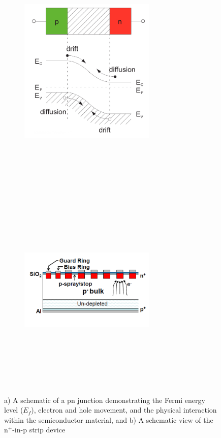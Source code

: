\begin{figure}[h]
    \begin{subfigure}[b]{0.45\textwidth}
        \centering
        \includegraphics[width=6.5cm,height=10cm,keepaspectratio]{Figures/modules/Pnjunction.png}
        \caption{}\label{fig:siliconpnjunction}
    \end{subfigure}
    ~
    \begin{subfigure}[b]{0.45\textwidth}
        \centering
        \includegraphics[width=6.5cm,height=10cm,keepaspectratio]{Figures/modules/striplayout.PNG}
        \caption{}\label{fig:striplayout}
    \end{subfigure}
    \caption{a) A schematic of a pn junction demonstrating the Fermi energy level ($E_f$), electron and hole movement, and the physical interaction within the semiconductor material\cite{kolanski}, and b) A schematic view of the n$^+$-in-p strip device\cite{striplayout}}
    
\end{figure}


